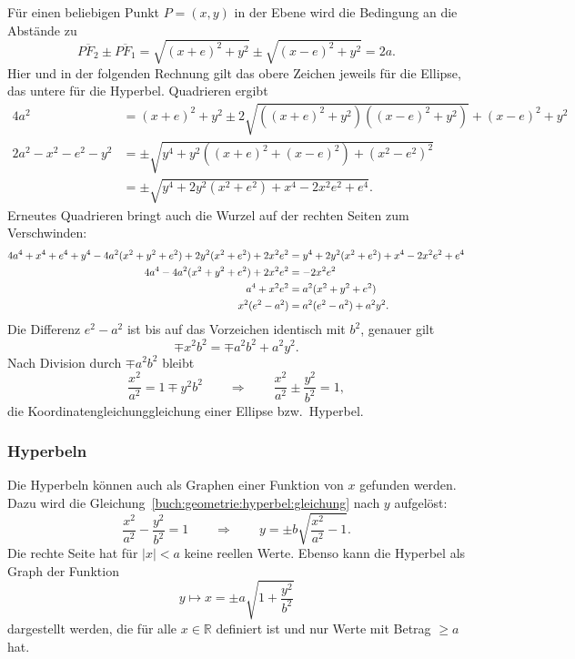 Für einen beliebigen Punkt $P=(x,y)$ in der Ebene wird die Bedingung
an die Abstände zu
\[
\overline{PF_2}
\pm
\overline{PF_1}
=
\sqrt{(x+e)^2+y^2}
\pm
\sqrt{(x-e)^2+y^2}
=
2a.
\]
Hier und in der folgenden Rechnung gilt das obere Zeichen jeweils
für die Ellipse, das untere für die Hyperbel.
Quadrieren ergibt
\begin{align*}
4a^2
&=
(x+e)^2+y^2
\pm
2\sqrt{
((x+e)^2+y^2)
((x-e)^2+y^2)
}
+
(x-e)^2+y^2
\\
2a^2-x^2-e^2-y^2
&=
\pm\sqrt{
y^4 + y^2((x+e)^2 + (x-e)^2) +(x^2-e^2)^2
}
\\
&=
\pm\sqrt{y^4 + 2y^2 ( x^2+e^2) +x^4 - 2x^2e^2 + e^4}.
\end{align*}
Erneutes Quadrieren bringt auch die Wurzel auf der rechten Seiten
zum Verschwinden:
\begin{align}
4a^4 + x^4 + e^4 + y^4
-4a^2(x^2+y^2+e^2)
+2y^2(x^2+e^2)+2x^2e^2
&=
y^4+2y^2(x^2 +e^2) + x^4 -2x^2e^2+e^4
\notag
\\
4a^4
-4a^2(x^2+y^2+e^2)
+2x^2e^2
&=
-2x^2e^2
\notag
\\
a^4+x^2e^2&=a^2(x^2+y^2+e^2)
\notag
\\
x^2(e^2-a^2)&=a^2(e^2-a^2) + a^2y^2.
\notag
\end{align}
Die Differenz $e^2-a^2$ ist bis auf das Vorzeichen identisch mit $b^2$,
genauer gilt
\begin{equation*}
\mp x^2b^2 = \mp a^2b^2 + a^2y^2.
\end{equation*}
Nach Division durch $\mp a^2b^2$ bleibt
\begin{equation}
\frac{x^2}{a^2} = 1 \mp{y^2}{b^2}
\qquad\Rightarrow\qquad
\frac{x^2}{a^2} \pm \frac{y^2}{b^2} = 1,
\label{buch:geometrie:hyperbel:gleichung}
\end{equation}
die Koordinatengleichunggleichung einer Ellipse bzw.~Hyperbel.

%
%
\subsubsection{Hyperbeln}
Die Hyperbeln können auch als Graphen einer Funktion von $x$ gefunden werden.
Dazu wird die Gleichung~\eqref{buch:geometrie:hyperbel:gleichung}
nach $y$ aufgelöst:
\[
\frac{x^2}{a^2}
-
\frac{y^2}{b^2}
=
1
\qquad\Rightarrow\qquad
y
=
\pm
b\sqrt{\frac{x^2}{a^2}-1}.
\]
Die rechte Seite hat für $|x|<a$ keine reellen Werte.
Ebenso kann die Hyperbel als Graph der Funktion
\[
y\mapsto x = \pm a\sqrt{1+\frac{y^2}{b^2}}
\]
dargestellt werden, die für alle $x\in\mathbb{R}$ definiert ist und
nur Werte mit Betrag $\ge a$ hat.


